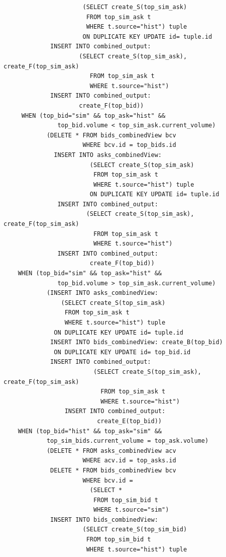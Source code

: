 \documentclass{article}
\begin{document}
\begin{verbatim}
                      (SELECT create_S(top_sim_ask)
                       FROM top_sim_ask t
                       WHERE t.source="hist") tuple
                      ON DUPLICATE KEY UPDATE id= tuple.id
             INSERT INTO combined_output:
                     (SELECT create_S(top_sim_ask), create_F(top_sim_ask)
                        FROM top_sim_ask t
                        WHERE t.source="hist")
             INSERT INTO combined_output:
                     create_F(top_bid))
     WHEN (top_bid="sim" && top_ask="hist" &&
               top_bid.volume < top_sim_ask.current_volume)
            (DELETE * FROM bids_combinedView bcv
                      WHERE bcv.id = top_bids.id 
              INSERT INTO asks_combinedView: 
                        (SELECT create_S(top_sim_ask)
                         FROM top_sim_ask t
                         WHERE t.source="hist") tuple
                        ON DUPLICATE KEY UPDATE id= tuple.id
               INSERT INTO combined_output:
                       (SELECT create_S(top_sim_ask), create_F(top_sim_ask)
                         FROM top_sim_ask t
                         WHERE t.source="hist")
               INSERT INTO combined_output:
                        create_F(top_bid))
    WHEN (top_bid="sim" && top_ask="hist" &&
               top_bid.volume > top_sim_ask.current_volume)
            (INSERT INTO asks_combinedView: 
                (SELECT create_S(top_sim_ask)
                 FROM top_sim_ask t
                 WHERE t.source="hist") tuple
              ON DUPLICATE KEY UPDATE id= tuple.id
             INSERT INTO bids_combinedView: create_B(top_bid)
              ON DUPLICATE KEY UPDATE id= top_bid.id
             INSERT INTO combined_output:
                         (SELECT create_S(top_sim_ask), create_F(top_sim_ask)
                           FROM top_sim_ask t
                           WHERE t.source="hist")
                 INSERT INTO combined_output:
                          create_E(top_bid))
    WHEN (top_bid="hist" && top_ask="sim" &&
            top_sim_bids.current_volume = top_ask.volume)
            (DELETE * FROM asks_combinedView acv
                      WHERE acv.id = top_asks.id
             DELETE * FROM bids_combinedView bcv
                      WHERE bcv.id = 
                        (SELECT *
                         FROM top_sim_bid t
                         WHERE t.source="sim")
             INSERT INTO bids_combinedView: 
                      (SELECT create_S(top_sim_bid)
                       FROM top_sim_bid t
                       WHERE t.source="hist") tuple

\end{verbatim}
\end{document}
